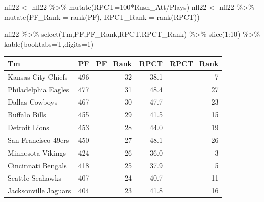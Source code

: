 \documentclass[
  11pt,
]{book}
\newenvironment{Shaded}{\begin{snugshade}}{\end{snugshade}}
\newcommand{\AttributeTok}[1]{\textcolor[rgb]{0.77,0.63,0.00}{#1}}
\newcommand{\DecValTok}[1]{\textcolor[rgb]{0.00,0.00,0.81}{#1}}
\newcommand{\FunctionTok}[1]{\textcolor[rgb]{0.00,0.00,0.00}{#1}}
\newcommand{\NormalTok}[1]{#1}
\newcommand{\OtherTok}[1]{\textcolor[rgb]{0.56,0.35,0.01}{#1}}
\newcommand{\SpecialCharTok}[1]{\textcolor[rgb]{0.00,0.00,0.00}{#1}}
\newcommand{\StringTok}[1]{\textcolor[rgb]{0.31,0.60,0.02}{#1}}
\theoremstyle{definition}
\theoremstyle{definition}
\theoremstyle{definition}
\theoremstyle{definition}
\theoremstyle{remark}
\begin{document}
\newpage

\begin{Shaded}
\begin{Highlighting}[]
\NormalTok{nfl22 }\OtherTok{\textless{}{-}}\NormalTok{ nfl22 }\SpecialCharTok{\%\textgreater{}\%} \FunctionTok{mutate}\NormalTok{(}\StringTok{\textasciigrave{}}\AttributeTok{RPCT}\StringTok{\textasciigrave{}}\OtherTok{=}\DecValTok{100}\SpecialCharTok{*}\NormalTok{Rush\_Att}\SpecialCharTok{/}\NormalTok{Plays)}
\NormalTok{nfl22 }\OtherTok{\textless{}{-}}\NormalTok{ nfl22 }\SpecialCharTok{\%\textgreater{}\%} 
  \FunctionTok{mutate}\NormalTok{(}\AttributeTok{PF\_Rank =} \FunctionTok{rank}\NormalTok{(PF),}
         \AttributeTok{RPCT\_Rank =} \FunctionTok{rank}\NormalTok{(RPCT))}
\end{Highlighting}
\end{Shaded}

\begin{Shaded}
\begin{Highlighting}[]
\NormalTok{nfl22 }\SpecialCharTok{\%\textgreater{}\%} \FunctionTok{select}\NormalTok{(Tm,PF,PF\_Rank,RPCT,RPCT\_Rank) }\SpecialCharTok{\%\textgreater{}\%} \FunctionTok{slice}\NormalTok{(}\DecValTok{1}\SpecialCharTok{:}\DecValTok{10}\NormalTok{) }\SpecialCharTok{\%\textgreater{}\%} \FunctionTok{kable}\NormalTok{(}\AttributeTok{booktabs=}\NormalTok{T,}\AttributeTok{digits=}\DecValTok{1}\NormalTok{)}
\end{Highlighting}
\end{Shaded}

\begin{tabular}{lrrrr}
\toprule
Tm & PF & PF\_Rank & RPCT & RPCT\_Rank\\
\midrule
Kansas City Chiefs & 496 & 32 & 38.1 & 7\\
Philadelphia Eagles & 477 & 31 & 48.4 & 27\\
Dallas Cowboys & 467 & 30 & 47.7 & 23\\
Buffalo Bills & 455 & 29 & 41.5 & 15\\
Detroit Lions & 453 & 28 & 44.0 & 19\\
\addlinespace
San Francisco 49ers & 450 & 27 & 48.1 & 26\\
Minnesota Vikings & 424 & 26 & 36.0 & 3\\
Cincinnati Bengals & 418 & 25 & 37.9 & 5\\
Seattle Seahawks & 407 & 24 & 40.7 & 11\\
Jacksonville Jaguars & 404 & 23 & 41.8 & 16\\
\bottomrule
\end{tabular}
\end{document}
